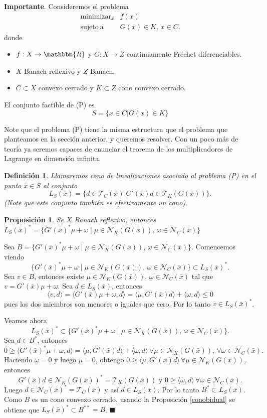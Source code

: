 \documentclass[a4paper,10pt]{book}
\newcommand{\R}{\mathbbm{R}}
\newcommand{\arr}{\rightarrow}
\newcommand{\bx}{\bar{x}}
\newcommand{\cN}{\mathcal{N}}
\newcommand{\cT}{\mathcal{T}}
\newcommand{\la}{\langle}
\newcommand{\ra}{\rangle}
\newtheorem{prop}[teo]{Proposici\'on}
\newtheorem{defi}[teo]{Definici\'on}
\newenvironment{dem}{\vspace*{-0.1cm}{\it Demostraci\'on:}}{\hfill
$\blacksquare$\\}
\begin{document}
\textbf{Importante}.
Consideremos el problema
\[\tag{P}
\begin{array}{rl}
\displaystyle \mathop{\mathrm{minimizar}}_{x} & \displaystyle f(x) \\
\mathrm{sujeto \ a} & G(x)\in K,\, x\in C.
\end{array}
\]
donde
\begin{itemize}
\item$f:X\arr\R$ y $G:X\arr Z$ continuamente Fréchet diferenciables.

\item $X$ Banach reflexivo y $Z$ Banach,

\item $C\subset X$ convexo cerrado y $K\subset Z$ cono convexo cerrado.
\end{itemize}


El conjunto factible de (P) es $$S=\{x\in C | G(x)\in K\}$$

Note que el problema (P) tiene la misma estructura que el problema que planteamos en la sección anterior, y queremos resolver. Con un poco más de teoría ya seremos capaces de enunciar el teorema de los multiplicadores de Lagrange en dimensión infinita.

\begin{defi}
 Llamaremos cono de linealizaciones asociado al problema (P) en el punto $\bx \in S$ al conjunto $$L_S(\bx)=\{d\in\cT_C(\bx) | G'(\bx)d\in \cT_K(G(\bx))\}.$$
 (Note que este conjunto también es efectivamente un cono).
\end{defi} 

\begin{prop}
Se $X$ Banach reflexivo, entonces $L_S(\bx)^* = \{G'(\bx)^*\mu + \omega\mid\mu\in\cN_K(G(\bx)),\, \omega\in\cN_C(\bx)\}$
\end{prop} 
\begin{dem}
Sea $B=\{G'(\bx)^*\mu+\omega\mid\mu\in\cN_K(G(\bx)),\,\omega\in \cN_C(\bx)\}$. Comencemos viendo $$\{G'(\bx)^*\mu + \omega\mid\mu\in\cN_K(G(\bx)),\, \omega\in\cN_C(\bx)\}\subset L_S(\bx)^*.$$ Sea $v\in B$, entonces existe $\mu\in\cN_K(G(\bx)),\,\omega\in\cN_C(\bx)$ tal que $v=G'(\bx)\mu+\omega.$ Sea $d\in L_S(\bx)$, entonces $$\la v,d\ra=\la G'(\bx)\mu+\omega,d\ra=\la \mu,G'(\bx)d\ra+\la\omega,d\ra\leq0$$ pues los dos miembros son menores o iguales que cero. Por lo tanto $v\in L_S(\bx)^*$.

Veamos ahora $$L_S(\bx)^* \subset \{G'(\bx)^*\mu + \omega\mid\mu\in\cN_K(G(\bx)),\, \omega\in\cN_C(\bx)\}.$$ Sea $d\in B^*$, entonces $$0\geq\la G'(\bx)^*\mu+\omega,d\ra=\la\mu,G'(\bx)d\ra+\la\omega,d\ra\,\forall\mu\in\cN_K(G(\bx)),\,\forall \omega\in\cN_C(\bx).$$ Haciendo $\omega=0$ y luego $\mu=0$, obtengo $0\geq\la\mu,G'(\bx)d\ra\,\forall\mu\in\cN_K(G(\bx))$, entonces $$G'(\bx)d\in\cN_K(G(\bx))^*=\cT_K(G(\bx))\mbox{ y }0\geq\la\omega,d\ra\,\forall\omega\in\cN_C(\bx).$$ Luego $d\in\cN_C(\bx)^*=\cT_C(\bx)$ y así $d\in L_S(\bx)$. Por lo tanto $B^*\subset L_S(\bx)$. Como $B$ es un cono convexo cerrado, usando la Proposición \ref{conobidual} se obtiene que $L_S(\bx)^*\subset B^{**}=B$.
\end{dem}
\end{document}
